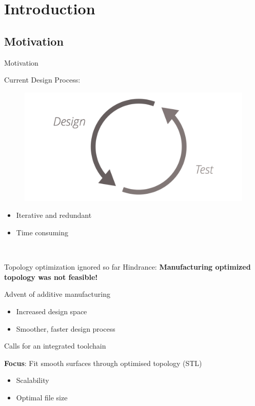 \section{Introduction} %
\newcommand{\norm}[1]{\parallel #1 \parallel_2}

\subsection{Motivation}
\begin{frame}{Motivation}
\begin{multicols}{2}
Current Design Process:
\begin{figure}
\includegraphics[width=0.8\linewidth]{Pictures/Motivation/DesignTest.png}
\end{figure}
\begin{itemize}
\item Iterative and redundant
\item Time consuming
\end{itemize}~\\
\pause

Topology optimization ignored so far
\newline
\newline
Hindrance: \textbf{Manufacturing optimized topology was not feasible!}
\newline
\vfill
\columnbreak

\pause

Advent of additive manufacturing
\begin{itemize}
\item Increased design space
\item Smoother, faster design process
\end{itemize}
Calls for an integrated toolchain
\newline

\pause
\begin{tcolorbox}
\textbf{Focus}: Fit smooth surfaces through optimised topology (STL)
\begin{itemize}
\item Scalability
\item Optimal file size
\end{itemize}
\end{tcolorbox}


\end{multicols}
\end{frame}

